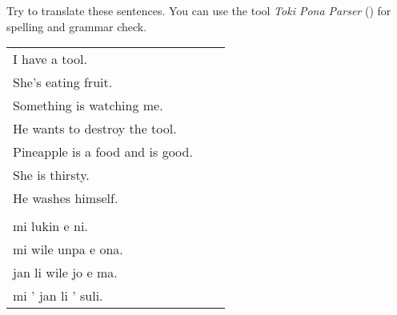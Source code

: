 Try to translate these sentences. 
You can use the tool \textit{Toki Pona Parser} (\cite{www:rowa:02}) for spelling and grammar check. 

\begin{supertabular}{p{5,5cm}|ll}
I have a tool. &&  \\ %
She's eating fruit. &&  \\ %
Something is watching me. &&  \\ %
He wants to destroy the tool. &&  \\ %
Pineapple is a food and is good. &&  \\ %
She is thirsty. && \\ %
He washes himself. &&  \\ %
  && \\ %
mi lukin e ni. &&  \\ %
mi wile unpa e ona. &&   \\ %
jan li wile jo e ma. &&  \\ %
mi ' jan li ' suli. &&  \\ %
\end{supertabular} 
